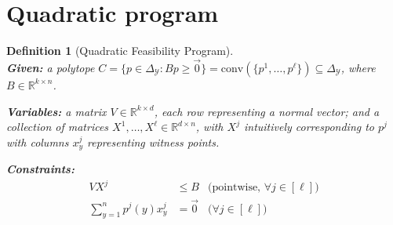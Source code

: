 \documentclass[12pt]{article}
\newcommand{\reals}{\mathbb{R}}
\newcommand{\simplex}{\Delta_\Y}
\newcommand{\Y}{\mathcal{Y}}
\newcommand{\inprod}[2]{\langle #1, #2 \rangle}%
\newcommand{\conv}{\mathrm{conv}}
\newtheorem{definition}{Definition}
\begin{document}
  \section{Quadratic program}
  
  \begin{definition}[Quadratic Feasibility Program] ~ \\
    \indent \textbf{Given:} a polytope $C = \{p \in \simplex : Bp \geq \vec 0\} = \conv(\{p^1, \ldots, p^\ell\}) \subseteq \simplex$, where $B \in \reals^{k \times n}$.

    \textbf{Variables:} a matrix $V \in \reals^{k \times d}$, each row representing a normal vector; and a collection of matrices $X^1,\ldots,X^{\ell} \in \reals^{d \times n}$, with $X^j$ intuitively corresponding to $p^j$ with columns $x^j_y$ representing witness points.

    \textbf{Constraints:}
      \begin{align}
        V X^j            &\leq B    & \text{(pointwise, $\forall j \in [\ell]$)}  \label{eqn:qp-constr-1} \\
        \sum_{y=1}^n p^j(y) x^j_y &= \vec 0  & \text{($\forall j \in [\ell]$)}    \label{eqn:qp-constr-2} 
      \end{align}
  \end{definition}
\end{document}
